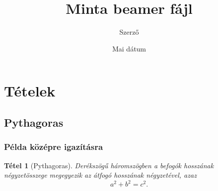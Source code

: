 \documentclass{beamer} %
\title{Minta beamer fájl}
\author{Szerző}
\date{Mai dátum}
\newtheorem{tetel}{Tétel}
\begin{document}
\frenchspacing



\begin{frame}  %
	\maketitle
\end{frame} %


\begin{frame}  %
	\tableofcontents %
\end{frame} %


\section{Tételek}
\subsection{Pythagoras}
\begin{frame}
  \frametitle{Példa középre igazításra} %
  \begin{tetel}[Pythagoras]
	 Derékszögű háromszögben a befogók hosszának négyzetösszege megegyezik az átfogó hosszának négyzetével, azaz
	 \[ a^2+b^2=c^2. \]
  \end{tetel}

\end{frame}

\end{document}
